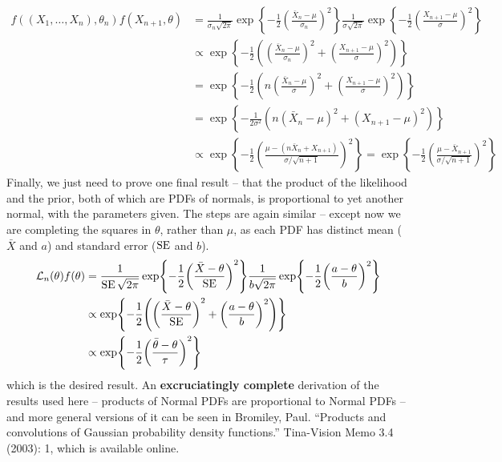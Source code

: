 \begin{align*} 
f((X_{1}, \dots, X_{n}), \theta_{n}) f(X_{n+1}, \theta) &= 
\frac{1}{\sigma_{n} \sqrt{2 \pi}} \exp \left\{-\frac{1}{2} \left(\frac{\bar{X}_{n} - \mu}{\sigma_{n}} \right)^{2} \right\}
\frac{1}{\sigma \sqrt{2 \pi}} \exp \left\{-\frac{1}{2} \left(\frac{X_{n+1} - \mu}{\sigma} \right)^{2} \right\} \\
&\propto \exp \left\{-\frac{1}{2} \left( \left(\frac{\bar{X}_{n} - \mu}{\sigma_{n}} \right)^{2} + \left(\frac{X_{n+1} - \mu}{\sigma} \right)^{2} \right) \right\} \\
&= \exp \left\{-\frac{1}{2} \left( n \left(\frac{\bar{X}_{n} - \mu}{\sigma} \right)^{2} + \left(\frac{X_{n+1} - \mu}{\sigma} \right)^{2} \right) \right\} \\
&= \exp \left\{-\frac{1}{2 \sigma^{2}} \left( n \left(\bar{X}_{n} - \mu\right)^{2} + \left(X_{n+1} - \mu \right)^{2} \right) \right\} \\
&\propto \exp \left\{-\frac{1}{2} \left( \frac{\mu - (n\bar{X}_{n} + X_{n+1})}{\sigma / \sqrt{n+1}} \right)^{2} \right\}
= \exp \left\{-\frac{1}{2}
\left(\frac{\mu - \bar{X}_{n+1}}{\sigma / \sqrt{n+1}}\right)^{2}
\right\}
\end{align*}
Finally, we just need to prove one final result -- that the product of
the likelihood and the prior, both of which are PDFs of normals, is
proportional to yet another normal, with the parameters given. The steps
are again similar -- except now we are completing the squares in
\(\theta\), rather than \(\mu\), as each PDF has distinct mean
(\(\bar{X}\) and \(a\)) and standard error (\(\operatorname{\mathrm{SE}} \) and
\(b\)).
\begin{align*}
\mathcal{L}_{n}(\theta) f(\theta) 
&= \frac{1}{\SE \sqrt{2 \pi}} \exp \left\{-\frac{1}{2} \left(\frac{\bar{X} - \theta}{\SE }\right)^{2} \right\} \frac{1}{b \sqrt{2 \pi}} \exp \left\{-\frac{1}{2} \left( \frac{a - \theta}{b} \right)^{2} \right\} \\
& \propto \exp \left\{-\frac{1}{2} \left( \left(\frac{\bar{X} - \theta}{\SE }\right)^{2} + \left( \frac{a - \theta}{b} \right)^{2} \right) \right\} \\
& \propto \exp \left\{-\frac{1}{2} \left( \frac{\bar{\theta} - \theta}{\tau} \right)^{2} \right\}
\end{align*}
which is the desired result.
An \textbf{excruciatingly complete} derivation of the results used here
-- products of Normal PDFs are proportional to Normal PDFs -- and more
general versions of it can be seen in Bromiley, Paul. ``Products and
convolutions of Gaussian probability density functions.'' Tina-Vision
Memo 3.4 (2003): 1, which is available online.

